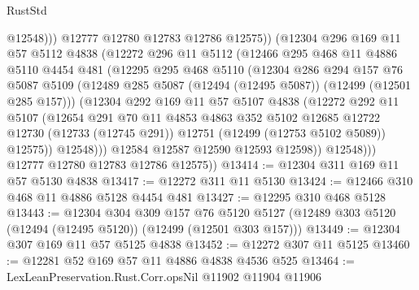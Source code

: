 \begin{lexlean}{RustStd}
\begin{coremodule}
                      @12548)))
                @12777
                @12780
                @12783
                @12786
                @12575))
            (@12304
              @296
              @169
              @11
              @57
              @5112
              @4838
              (@12272
                @296
                @11
                @5112
                (@12466
                  @295
                  @468
                  @11
                  @4886
                  @5110
                  @4454
                  @481
                  (@12295
                    @295
                    @468
                    @5110
                    (@12304
                      @286
                      @294
                      @157
                      @76
                      @5087
                      @5109
                      (@12489 @285 @5087 (@12494 (@12495 @5087)) (@12499 (@12501 @285 @157)))
                      (@12304
                        @292
                        @169
                        @11
                        @57
                        @5107
                        @4838
                        (@12272
                          @292
                          @11
                          @5107
                          (@12654
                            @291
                            @70
                            @11
                            @4853
                            @4863
                            @352
                            @5102
                            @12685
                            @12722
                            @12730
                            (@12733 (@12745 @291))
                            @12751
                            (@12499 (@12753 @5102 @5089))
                            @12575))
                        @12548)))
                  @12584
                  @12587
                  @12590
                  @12593
                  @12598))
              @12548)))
        @12777
        @12780
        @12783
        @12786
        @12575))
@13414 := @12304 @311 @169 @11 @57 @5130 @4838
@13417 := @12272 @311 @11 @5130
@13424 := @12466 @310 @468 @11 @4886 @5128 @4454 @481
@13427 := @12295 @310 @468 @5128
@13443 := @12304
    @304
    @309
    @157
    @76
    @5120
    @5127
    (@12489 @303 @5120 (@12494 (@12495 @5120)) (@12499 (@12501 @303 @157)))
@13449 := @12304 @307 @169 @11 @57 @5125 @4838
@13452 := @12272 @307 @11 @5125
@13460 := @12281 @52 @169 @57 @11 @4886 @4838 @4536 @525
@13464 := LexLeanPreservation.Rust.Corr.opsNil @11902 @11904 @11906

\end{coremodule}
\end{lexlean}
